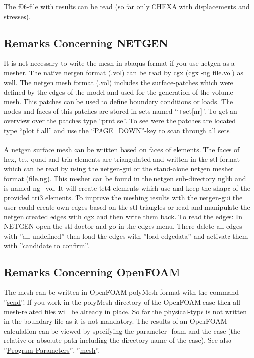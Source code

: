 \documentclass{article}
\providecommand{\htmlref}[2]{\hyperref[#2]{#1}}
\begin{document}
\begin{appendix}
The f06-file with results can be read (so far only CHEXA with displacements and stresses).

\subsection{\label{Remarks Concerning NETGEN}Remarks Concerning NETGEN}
It is not necessary to write the mesh in abaqus format if you use netgen as a mesher. The native netgen format (.vol) can be read by cgx (cgx -ng file.vol) as well. The netgen mesh format (.vol) includes the surface-patches which were defined by the edges of the model and used for the generation of the volume-mesh. This patches can be used to define boundary conditions or loads. The nodes and faces of this patches are stored in sets named ``+set[nr]''. To get an overview over the patches type ``\htmlref{prnt}{prnt} se''. To see were the patches are located type ``\htmlref{plot}{plot} f all'' and use the ``PAGE\_DOWN''-key to scan through all sets.\\\\
A netgen surface mesh can be written based on faces of elements. The faces of hex, tet, quad and tria elements are triangulated and written in the stl format which can be read by using the netgen-gui or the stand-alone netgen mesher format (file.ng). This mesher can be found in the netgen sub-directory nglib and is named ng\_vol. It will create tet4 elements which use and keep the shape of the provided tri3 elements. To improve the meshing results with the netgen-gui the user could create own edges based on the stl triangles or read and manipulate the netgen created edges with cgx and then write them back. To read the edges: In NETGEN open the stl-doctor and go in the edges menu. There delete all edges with ''all undefined'' then load the edges with ''load edgedata'' and activate them with ''candidate to confirm''.

\subsection{\label{Remarks Concerning OpenFOAM}Remarks Concerning OpenFOAM}
The mesh can be written in OpenFOAM polyMesh format with the command ''\htmlref{send}{send}''. If you work in the polyMesh-directory of the OpenFOAM case then all mesh-related files will be already in place. So far the physical-type is not written in the boundary file as it is not mandatory. The results of an OpenFOAM calculation can be viewed by specifying the parameter -foam and the case (the relative or absolute path including the directory-name of the case). See also ''\htmlref{Program Parameters}{Program Parameters}'', ''\htmlref{mesh}{mesh}''.


\end{appendix}
\end{document}
